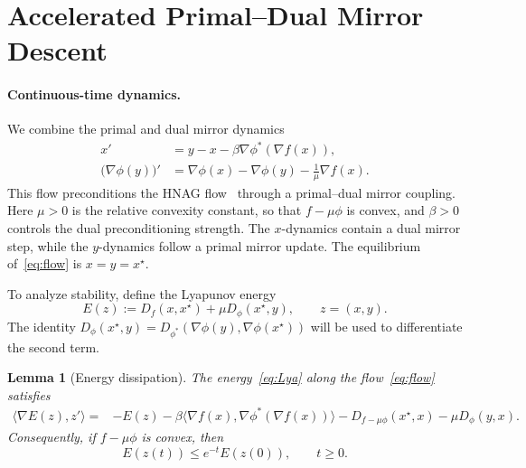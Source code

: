 \documentclass{article}
\theoremstyle{plain}
\newtheorem{lemma}[theorem]{Lemma}
\theoremstyle{definition}
\theoremstyle{remark}
\newtheorem{remark}[theorem]{Remark}
\begin{document}
%
%
\section{Accelerated Primal--Dual Mirror Descent}

\paragraph{Continuous-time dynamics.}
We combine the primal and dual mirror dynamics
\begin{equation}\label{eq:flow}
\begin{aligned}
x' &= y - x - \beta \nabla \phi^*(\nabla f(x)), \\
\bigl(\nabla \phi(y)\bigr)' &= \nabla \phi(x) - \nabla \phi(y) - \tfrac{1}{\mu}\nabla f(x).
\end{aligned}
\end{equation}
This flow preconditions the HNAG flow~\citep{chen_first_2019} through a primal--dual mirror coupling. Here $\mu>0$ is the relative convexity constant, so that $f-\mu\phi$ is convex, and $\beta>0$ controls the dual preconditioning strength. The $x$-dynamics contain a dual mirror step, while the $y$-dynamics follow a primal mirror update. The equilibrium of~\eqref{eq:flow} is $x=y=x^\star$.

To analyze stability, define the Lyapunov energy
\begin{equation}\label{eq:Lya}
E(z):=D_f(x,x^\star)+\mu D_\phi(x^\star,y), \qquad z=(x,y).
\end{equation}
The identity $D_\phi(x^\star,y)=D_{\phi^*}(\nabla\phi(y),\nabla\phi(x^\star))$ will be used to differentiate the second term.

\begin{lemma}[Energy dissipation]\label{lm:SL}
The energy~\eqref{eq:Lya} along the flow~\eqref{eq:flow} satisfies
\begin{equation}\label{eq:SL}
\begin{aligned}
\langle \nabla E(z),z'\rangle
={}&-E(z)-\beta\langle \nabla f(x),\nabla\phi^*(\nabla f(x))\rangle
-D_{f-\mu\phi}(x^\star,x)-\mu D_\phi(y,x).
\end{aligned}
\end{equation}
Consequently, if $f-\mu\phi$ is convex, then
$$
E(z(t))\le e^{-t}E(z(0)), \qquad t\ge 0.
$$
\end{lemma}
\end{document}
